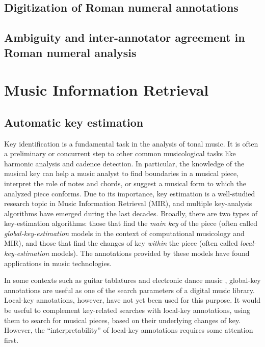 \subsection{Digitization of Roman numeral annotations}
\subsection{Ambiguity and inter-annotator agreement in Roman numeral analysis}

\section{Music Information Retrieval}
\subsection{Automatic key estimation}

Key identification is a fundamental task in the analysis of tonal music. 
It is often a preliminary or concurrent step to other common musicological tasks like harmonic analysis and cadence detection. 
In particular, the knowledge of the musical key can help a music analyst to find boundaries in a musical piece, interpret the role of notes and chords, or suggest a musical form to which the analyzed piece conforms.
Due to its importance, key estimation is a well-studied research topic in Music Information Retrieval (MIR), and multiple key-analysis algorithms have emerged during the last decades. 
Broadly, there are two types of key-estimation algorithms: those that find the \emph{main key} of the piece (often called \emph{global-key-estimation} models in the context of computational musicology and MIR), and those that find the changes of key \emph{within} the piece (often called \emph{local-key-estimation} models). The annotations provided by these models have found applications in music technologies.

In some contexts such as guitar tablatures \cite{ultimateguitar} and electronic dance music \cite{gomez_tonal_2006}, global-key annotations are useful as one of the search parameters of a digital music library. 
Local-key annotations, however, have not yet been used for this purpose. 
It would be useful to complement key-related searches with local-key annotations, using them to search for musical pieces, based on their underlying changes of key. 
However, the ``interpretability'' of local-key annotations requires some attention first. 

